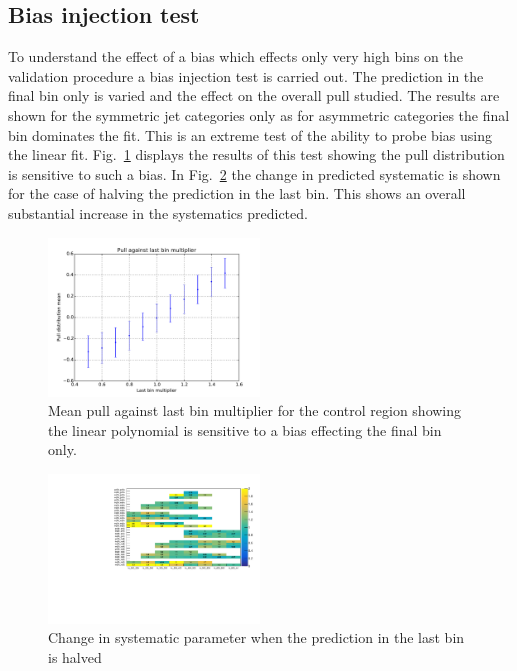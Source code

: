 \subsection{Bias injection test}

\label{sec:biasInj}
To understand the effect of a bias which effects only very high 
\mht bins on the validation procedure a bias injection test is carried out.
The prediction in the final bin only is varied and the effect on the 
overall pull studied. The results are shown for the symmetric jet categories only
as for asymmetric categories the final \mht bin dominates the fit. This is 
an extreme test of the ability to probe bias using the linear fit. 
Fig.~\ref{fig:biasInjTest} displays the results of this test showing
the pull distribution is sensitive to such a bias. In Fig.~\ref{fig:biasSyst} the 
change in predicted systematic is shown for the case of halving the prediction in the last bin. 
This shows an overall substantial increase in the systematics predicted.

\begin{figure}[]
  \centering
  \includegraphics[width=0.5\textwidth]{figures/template/biasInjTest.pdf}
  \caption{\label{fig:biasInjTest} Mean pull against last bin multiplier for 
  the \mj control region showing the linear polynomial is sensitive to a bias effecting the final bin only.}
\end{figure}

\begin{figure}[]
  \centering
  \includegraphics[width=0.5\textwidth]{figures/template/biasSystTest.pdf}
  \caption{\label{fig:biasSyst} Change in systematic parameter when the prediction in the last bin
  is halved}
\end{figure}

